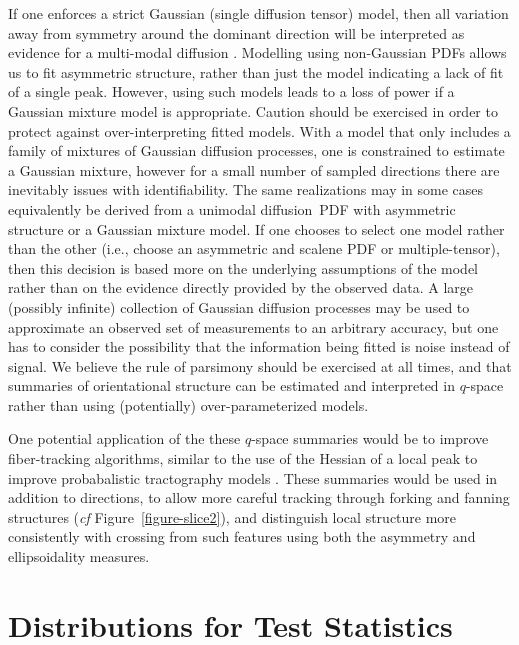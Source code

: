 \documentclass[dvips,aoas,preprint]{imsart}
\numberwithin{equation}{section}
\theoremstyle{plain}
\begin{document}
If one enforces a strict Gaussian (single diffusion tensor) model,
then all variation away from symmetry around the dominant direction
will be interpreted as evidence for a multi-modal diffusion
\citep{par-ale:pico,hos-wil-ans:inference,Behrens2007}.
Modelling using non-Gaussian PDFs allows us to fit asymmetric
structure, rather than just the model indicating a lack of fit of a
single peak. However, using such models leads to a loss of power if a
Gaussian mixture model is appropriate.  Caution should be exercised in
order to protect against over-interpreting fitted models.  With a
model that only includes a family of mixtures of Gaussian diffusion
processes, one is constrained to estimate a Gaussian mixture, however
for a small number of sampled directions there are inevitably issues
with identifiability.  The same realizations may in some cases
equivalently be derived from a unimodal diffusion~PDF with asymmetric
structure or a Gaussian mixture model.  If one chooses to select one
model rather than the other (i.e., choose an asymmetric and scalene
PDF or multiple-tensor), then this decision is based more on the
underlying assumptions of the model rather than on the evidence
directly provided by the observed data.  A large (possibly infinite)
collection of Gaussian diffusion processes may be used to approximate
an observed set of measurements to an arbitrary accuracy, but one has
to consider the possibility that the information being fitted is noise
instead of signal.  We believe the rule of parsimony should be
exercised at all times, and that summaries of orientational structure
can be estimated and interpreted in $q$-space rather than using
(potentially) over-parameterized models.

One potential application of the these $q$-space summaries would be to
improve fiber-tracking algorithms, similar to the use of the Hessian
of a local peak to improve probabalistic tractography models
\citep{Seunarine}.  These summaries would be used in addition to
directions, to allow more careful tracking through forking and fanning
structures ({\em cf} Figure~\ref{figure-slice2}), and distinguish
local structure more consistently with crossing from such features
using both the asymmetry and ellipsoidality measures.

\appendix

\section{Distributions for Test Statistics}
\end{document}
